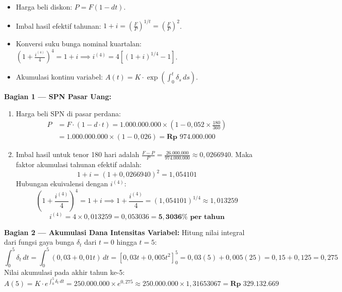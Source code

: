 \documentclass[11pt,a4paper]{article}
\begin{document}
\begin{petunjukbox}
\begin{itemize}[leftmargin=4mm, topsep=1pt, itemsep=1pt]
    \item Harga beli diskon: $P = F(1 - dt)$.
    \item Imbal hasil efektif tahunan: $1 + i = \left(\frac{F}{P}\right)^{1/t} = \left(\frac{F}{P}\right)^2$.
    \item Konversi suku bunga nominal kuartalan: $\left(1 + \frac{i^{(4)}}{4}\right)^4 = 1 + i \implies i^{(4)} = 4 \left[ (1+i)^{1/4} - 1 \right]$.
    \item Akumulasi kontinu variabel: $A(t) = K \cdot \exp\left(\int_0^t \delta_s \, ds\right)$.
\end{itemize}
\end{petunjukbox}

\begin{solusibox}
\textbf{Bagian 1 --- SPN Pasar Uang:}
\begin{enumerate}[label=(\alph*), leftmargin=4mm]
    \item Harga beli SPN di pasar perdana:
    \begin{align*}
        P &= F \cdot (1 - d \cdot t) = 1.000.000.000 \times \left(1 - 0{,}052 \times \frac{180}{360}\right) \\
        &= 1.000.000.000 \times (1 - 0{,}026) = \mathbf{\text{Rp } 974.000.000}
    \end{align*}
    \item Imbal hasil untuk tenor 180 hari adalah $\frac{F - P}{P} = \frac{26.000.000}{974.000.000} \approx 0{,}0266940$.  
    Maka faktor akumulasi tahunan efektif adalah:
    $$1 + i = (1 + 0{,}0266940)^2 = 1{,}054101$$
    Hubungan ekuivalensi dengan $i^{(4)}$:
    $$\left(1 + \frac{i^{(4)}}{4}\right)^4 = 1 + i \implies 1 + \frac{i^{(4)}}{4} = (1{,}054101)^{1/4} \approx 1{,}013259$$
    $$i^{(4)} = 4 \times 0{,}013259 = 0{,}053036 = \mathbf{5{,}3036\% \text{ per tahun}}$$
\end{enumerate}

\textbf{Bagian 2 --- Akumulasi Dana Intensitas Variabel:}
Hitung nilai integral dari fungsi gaya bunga $\delta_t$ dari $t=0$ hingga $t=5$:
$$\int_0^5 \delta_t \, dt = \int_0^5 (0{,}03 + 0{,}01t) \, dt = \left[ 0{,}03t + 0{,}005t^2 \right]_0^5 = 0{,}03(5) + 0{,}005(25) = 0{,}15 + 0{,}125 = 0{,}275$$
Nilai akumulasi pada akhir tahun ke-5:
$$A(5) = K \cdot e^{\int_0^5 \delta_t \, dt} = 250.000.000 \times e^{0{,}275} \approx 250.000.000 \times 1{,}31653067 = \mathbf{\text{Rp } 329.132.669}$$
\end{solusibox}
\end{document}
